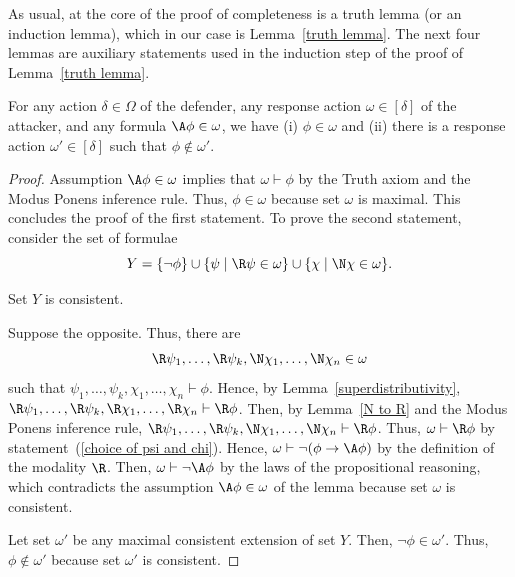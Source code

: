 \documentclass[letterpaper]{article}
\begin{document}
As usual, at the core of the proof of completeness is a truth lemma (or an induction lemma), which in our case is Lemma~\ref{truth lemma}. The next four lemmas are auxiliary statements used in the induction step of the proof of Lemma~\ref{truth lemma}.

\begin{lemma}\label{A child exists}
For any action $\delta\in\Omega$ of the defender, any response action $\omega\in [\delta]$ of the attacker, and any formula $\A\phi\in \omega$, we have
(i) $\phi\in\omega$ and
(ii) there is a response action $\omega'\in[\delta]$ such that $\phi\notin\omega'$.
\end{lemma}
\begin{proof}
Assumption $\A\phi\in \omega$ implies that $\omega\vdash\phi$ by the Truth axiom and the Modus Ponens inference rule. Thus, $\phi\in\omega$ because set $\omega$ is maximal. This concludes the proof of the first statement.
To prove the second statement, consider the set of formulae
\begin{equation}\label{Y definition}
    Y=\{\neg\phi\}\cup\{\psi\;|\;\R\psi\in\omega\}\cup\{\chi\;|\;\N\chi\in \omega\}.
\end{equation}
\begin{claim}
Set $Y$ is consistent.
\end{claim}
\begin{proof-of-claim}
Suppose the opposite. Thus, there are%
\begin{equation}\label{choice of psi and chi}
    \R\psi_1,\dots,\R\psi_k,\N\chi_1,\dots,\N\chi_n\in \omega
\end{equation}
such that
$
\psi_1,\dots,\psi_k,\chi_1,\dots,\chi_n\vdash \phi.
$
Hence, by Lemma~\ref{superdistributivity},
$
\R\psi_1,\dots,\R\psi_k,\R\chi_1,\dots,\R\chi_n\vdash \R\phi
$.
Then, by Lemma~\ref{N to R} and the Modus Ponens inference rule,
$
\R\psi_1,\dots,\R\psi_k,\N\chi_1,\dots,\N\chi_n\vdash \R\phi
$.
Thus,
$
\omega\vdash \R\phi
$
by statement~(\ref{choice of psi and chi}).
Hence,
$
\omega\vdash \neg(\phi\to\A\phi)
$
by the definition of the modality $\R$. Then,
$
\omega\vdash \neg\A\phi
$
by the laws of the propositional reasoning, which contradicts the assumption $\A\phi\in \omega$ of the lemma because set $\omega$ is consistent.
\end{proof-of-claim}
Let set $\omega'$ be any maximal consistent extension of set $Y$. Then, $\neg\phi\in \omega'$. Thus, $\phi\notin \omega'$ because set $\omega'$ is consistent.


\end{proof}
\end{document}
